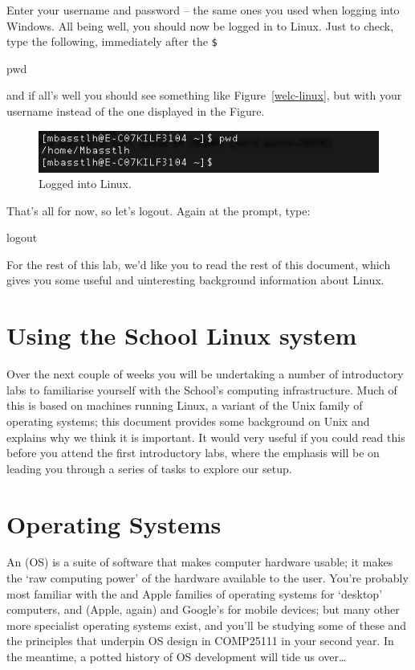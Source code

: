 Enter your username and password -- the same ones you used when
logging into Windows. All being well, you should now be logged in to
Linux. Just to check, type the following, immediately after the \verb|$|

\begin{ttoutenv}
pwd
\end{ttoutenv}

and if all's well you should see something like
Figure~\ref{welc-linux}, but with your username instead of the one
displayed in the Figure.

\begin{figure}
\centerline{\includegraphics[width=15cm]{images/welc-linux.png}}
\caption{Logged into Linux.}
\label{figure:welc-linux}
\end{figure}

That's all for now, so let's logout. Again at the prompt, type:

\begin{ttoutenv}
logout
\end{ttoutenv}

For the rest of this lab, we'd like you to read the rest of this
document, which gives you some useful and uinteresting background
information about Linux.

\section{Using the School Linux system}

Over the next couple of weeks you will be undertaking a number of
introductory labs to familiarise yourself with the School's computing
infrastructure. Much of this is based on machines running Linux, a
variant of the Unix family of operating systems; this document
provides some background on Unix and explains why we think it is
important. It would very useful if you could read this before you
attend the first introductory labs, where the emphasis will be on
leading you through a series of tasks to explore our setup.

\section{Operating Systems}

An  (OS) is a suite of
software that makes computer hardware usable; it makes the `raw
computing power' of the hardware available to the user. You're
probably most familiar with
the  and
Apple  families of operating systems for
`desktop' computers, and  (Apple, again) and
Google's  for mobile
devices; but many other more specialist operating systems exist, and
you'll be studying some of these and the principles that underpin OS
design in COMP25111 in your second year. In the meantime, a potted
history of OS development will tide us over\ldots
 
